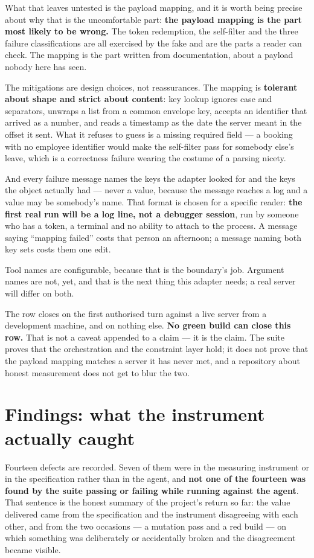 \documentclass[11pt,a4paper]{article}
\newcommand{\finding}[1]{{\color{primaryblue}\textbf{#1}}}
\begin{document}
What that leaves untested is the payload mapping, and it is worth being precise about why that is the uncomfortable part: \finding{the payload mapping is the part most likely to be wrong.} The token redemption, the self-filter and the three failure classifications are all exercised by the fake and are the parts a reader can check. The mapping is the part written from documentation, about a payload nobody here has seen.

The mitigations are design choices, not reassurances. The mapping is \textbf{tolerant about shape and strict about content}: key lookup ignores case and separators, unwraps a list from a common envelope key, accepts an identifier that arrived as a number, and reads a timestamp as the date the server meant in the offset it sent. What it refuses to guess is a missing required field --- a booking with no employee identifier would make the self-filter pass for somebody else's leave, which is a correctness failure wearing the costume of a parsing nicety.

And every failure message names the keys the adapter looked for and the keys the object actually had --- never a value, because the message reaches a log and a value may be somebody's name. That format is chosen for a specific reader: \textbf{the first real run will be a log line, not a debugger session}, run by someone who has a token, a terminal and no ability to attach to the process. A message saying ``mapping failed'' costs that person an afternoon; a message naming both key sets costs them one edit.

Tool names are configurable, because that is the boundary's job. Argument names are not, yet, and that is the next thing this adapter needs; a real server will differ on both.

The row closes on the first authorised turn against a live server from a development machine, and on nothing else. \finding{No green build can close this row.} That is not a caveat appended to a claim --- it is the claim. The suite proves that the orchestration and the constraint layer hold; it does not prove that the payload mapping matches a server it has never met, and a repository about honest measurement does not get to blur the two.

\section{Findings: what the instrument actually caught}
\label{sec:findings}

Fourteen defects are recorded. Seven of them were in the measuring instrument or
in the specification rather than in the agent, and \textbf{not one of the fourteen
was found by the suite passing or failing while running against the agent}. That
sentence is the honest summary of the project's return so far: the value
delivered came from the specification and the instrument disagreeing with each
other, and from the two occasions --- a mutation pass and a red build --- on
which something was deliberately or accidentally broken and the disagreement
became visible.
\end{document}
